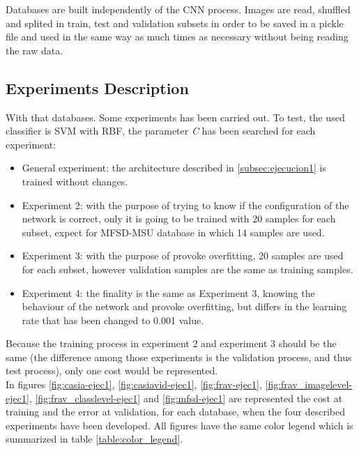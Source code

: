 Databases are built independently of the CNN process. Images are read, shuffled and splited in train, test and validation subsets in order to be saved in a pickle file and used in the same way as much times as necessary without being reading the raw data.

\subsection{Experiments Description}
With that databases. Some experiments has been carried out. To test, the used classifier is SVM with RBF, the parameter \textit{C} has been searched for each experiment:

\begin{itemize}
\item General experiment: the architecture described in \ref{subsec:ejecucion1} is trained without changes.
\item Experiment 2: with the purpose of trying to know if the configuration of the network is correct, only it is going to be trained with 20 samples for each subset, expect for MFSD-MSU database in which 14 samples are used.
\item Experiment 3: with the purpose of provoke overfitting, 20 samples are used for each subset, however validation samples are the same as training samples.
\item Experiment 4: the finality is the same as Experiment 3, knowing the behaviour of the network and provoke overfitting, but differs in the learning rate that has been changed to 0.001 value. \\
\end{itemize}


Because the training process in experiment 2 and experiment 3 should be the same (the difference among those experiments is the validation process, and thus test process), only one cost would be represented.\\

In figures \ref{fig:casia-ejec1}, \ref{fig:casiavid-ejec1}, \ref{fig:frav-ejec1}, \ref{fig:frav_imagelevel-ejec1}, \ref{fig:frav_classlevel-ejec1} and \ref{fig:mfsd-ejec1} are represented the cost at training and the error at validation, for each database, when the four described experiments have been developed. All figures have the same color legend which is summarized in table \ref{table:color_legend}.\\

